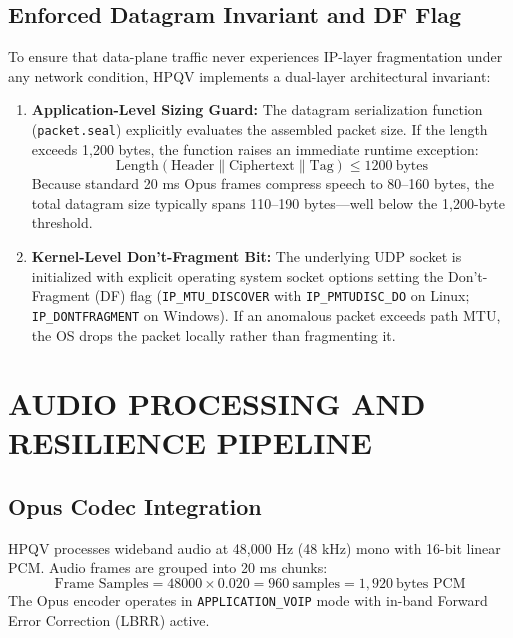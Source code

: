 \subsection{Enforced Datagram Invariant and DF Flag}
To ensure that data-plane traffic never experiences IP-layer fragmentation under any network condition, HPQV implements a dual-layer architectural invariant:
\begin{enumerate}
    \item \textbf{Application-Level Sizing Guard:} The datagram serialization function (\texttt{packet.seal}) explicitly evaluates the assembled packet size. If the length exceeds 1,200 bytes, the function raises an immediate runtime exception:
    \begin{equation}
        \text{Length}(\text{Header} \parallel \text{Ciphertext} \parallel \text{Tag}) \le 1200\ \text{bytes}
    \end{equation}
    Because standard 20 ms Opus frames compress speech to 80--160 bytes, the total datagram size typically spans 110--190 bytes—well below the 1,200-byte threshold.
    \item \textbf{Kernel-Level Don't-Fragment Bit:} The underlying UDP socket is initialized with explicit operating system socket options setting the Don't-Fragment (DF) flag (\texttt{IP\_MTU\_DISCOVER} with \texttt{IP\_PMTUDISC\_DO} on Linux; \texttt{IP\_DONTFRAGMENT} on Windows). If an anomalous packet exceeds path MTU, the OS drops the packet locally rather than fragmenting it.
\end{enumerate}

\section{AUDIO PROCESSING AND RESILIENCE PIPELINE}

\subsection{Opus Codec Integration}
HPQV processes wideband audio at 48,000 Hz (48 kHz) mono with 16-bit linear PCM. Audio frames are grouped into 20 ms chunks:
\begin{equation}
    \text{Frame Samples} = 48000 \times 0.020 = 960\ \text{samples} = 1,920\ \text{bytes PCM}
\end{equation}
The Opus encoder operates in \texttt{APPLICATION\_VOIP} mode with in-band Forward Error Correction (LBRR) active.

